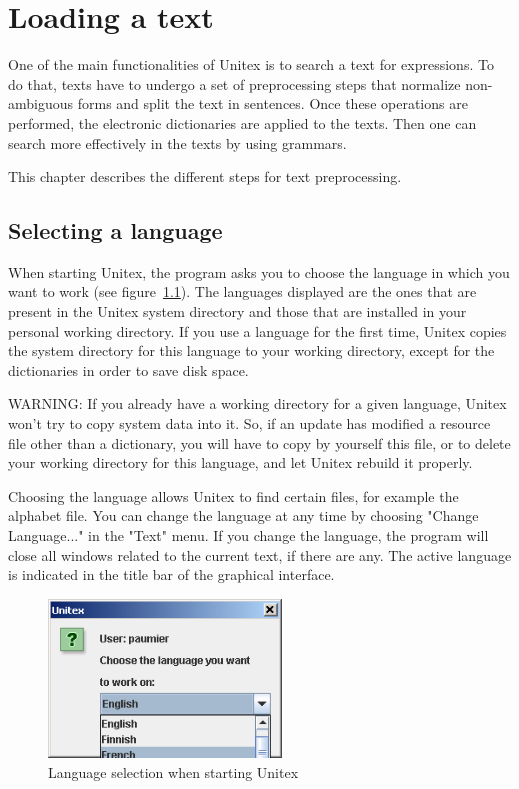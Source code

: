 \chapter{Loading a text}
\label{chap-text}

One of the main functionalities of Unitex is to search a text for expressions.
To do that, texts have to undergo a set of preprocessing steps that  normalize
non-ambiguous forms and split the text  in sentences. Once these operations are
performed, the electronic dictionaries are applied to the texts. Then one  can
search more effectively in the texts by using  grammars.

\bigskip
\noindent This chapter describes the different steps for text preprocessing.


\section{Selecting a language}
When starting Unitex, the program asks you to choose the language in which you
want to work (see figure~\ref{fig-language-selection}). The languages
displayed are the ones that are present in the
Unitex system directory
and those that are  installed in your
personal working directory.
If you use a language for the
first time, Unitex copies the system directory for this language to your working
directory, except for the dictionaries in order to save disk space.

\bigskip
\noindent WARNING: If
you already have a working directory for a given language, Unitex won't try to
copy system data into it. So, if an update has modified a resource file other
than a dictionary, you will have to copy by yourself this file, or to delete your
working directory for this language, and let Unitex rebuild it properly.

\bigskip
\noindent 
Choosing the language allows Unitex to find certain files, for example the
alphabet file.  You can change the language at any time by
choosing "Change Language..." in the "Text" menu. If you change the language, the
program will close all windows related to the current text, if there are any. The
active language is indicated in the title bar of the graphical interface.

\begin{figure}[!ht]
\begin{center}
\includegraphics[width=6.2cm]{resources/img/fig2-1.png}
\caption{\label{fig-language-selection}Language selection when starting
Unitex}
\end{center}
\end{figure}


